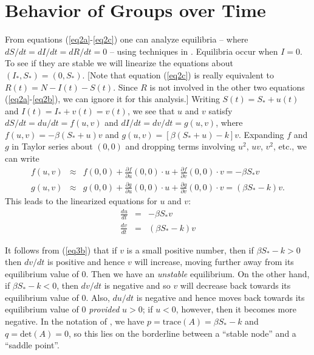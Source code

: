 \documentclass[11pt]{article}
\begin{document}
\section{Behavior of Groups over Time}
From equations (\ref{eq2a}-\ref{eq2c}) one can analyze equilibria -- where $dS/dt = 
dI/dt = dR/dt = 0$ -- using techniques in \cite[Sec. 9.2]{Tung}.  Equilibria 
occur when $I = 0$.  To see if they are stable we will linearize the
equations about $( I_{*} , S_{*} ) = (0, S_{*} )$.  [Note that equation (\ref{eq2c})
is really equivalent to $R(t) = N - I(t) - S(t)$.  Since $R$ is not involved
in the other two equations (\ref{eq2a}-\ref{eq2b}), we can ignore it for this analysis.]
Writing $S(t) = S_{*} + u(t)$ and $I(t) = I_{*} + v(t) = v(t)$, we see that $u$ and $v$
satisfy $dS/dt = du/dt = f(u,v)$ and $dI/dt = dv/dt = g(u,v)$,
where $f(u,v) = - \beta ( S_{*} + u ) v$ and 
$g(u,v) = [ \beta ( S_{*} + u ) - k] v$.  Expanding $f$ and $g$ in Taylor
series about $(0,0)$ and dropping terms involving $u^2$, $uv$, $v^2$, etc.,
we can write
\begin{eqnarray*}
f(u,v) & \approx & f(0,0) + \frac{\partial f}{\partial u} (0,0) \cdot u +
\frac{\partial f}{\partial v} (0,0) \cdot v = - \beta S_{*} v \\
g(u,v) & \approx & g(0,0) + \frac{\partial g}{\partial u} (0,0) \cdot u +
\frac{\partial g}{\partial v} (0,0) \cdot v = ( \beta S_{*} - k ) v .
\end{eqnarray*}
This leads to the linearized equations for $u$ and $v$:
\begin{eqnarray}
\frac{du}{dt} & = & - \beta S_{*} v \label{eq3a} \\
\frac{dv}{dt} & = & ( \beta S_{*} - k ) v \label{eq3b} 
\end{eqnarray}

It follows from (\ref{eq3b}) that if $v$ is a small positive number, then
if $\beta S_{*} - k > 0$ then $dv/dt$ is positive and hence $v$ will increase,
moving further away from its equilibrium value of $0$.  Then we have an
{\em unstable} equilibrium.  On the other hand, if $\beta S_{*} - k < 0$,
then $dv/dt$ is negative and so $v$ will decrease back towards its 
equilibrium value of $0$.  Also, $du/dt$ is negative and hence moves
back towards its equilibrium value of $0$ {\em provided} $u > 0$; if $u < 0$,
however, then it becomes more negative.  In the notation of \cite[pp. 164-165]{Tung},
we have $p = \mbox{trace}(A) = \beta S_{*} - k$ and $q = \mbox{det} (A) = 0$,
so this lies on the borderline between a ``stable node'' and a ``saddle point''.
\end{document}
